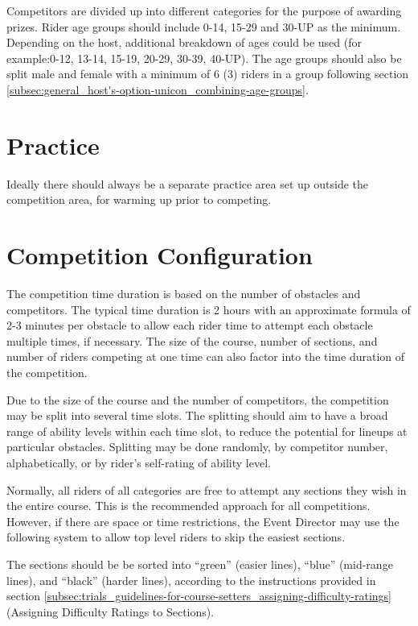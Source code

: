 Competitors are divided up into different categories for the purpose of awarding prizes. 
Rider age groups should include 0-14, 15-29 and 30-UP as the minimum. 
Depending on the host, additional breakdown of ages could be used (for example:0-12, 13-14, 15-19, 20-29, 30-39, 40-UP). 
The age groups should also be split male and female with a minimum of 6 (3) riders in a group following section \ref{subsec:general_host's-option-unicon_combining-age-groups}.

\section{Practice}

Ideally there should always be a separate practice area set up outside the competition area, for warming up prior to competing.

\section{Competition Configuration}

The competition time duration is based on the number of obstacles and competitors. 
The typical time duration is 2 hours with an approximate formula of 2-3 minutes per obstacle to allow each rider time to attempt each obstacle multiple times, if necessary. 
The size of the course, number of sections, and number of riders competing at one time can also factor into the time duration of the competition.

Due to the size of the course and the number of competitors, the competition may be split into several time slots. 
The splitting should aim to have a broad range of ability levels within each time slot, to reduce the potential for lineups at particular obstacles. Splitting may be done randomly, by competitor number, alphabetically, or by rider's self-rating of ability level.

\label{sec:trials_section-restrictions-for-competition-categories}
Normally, all riders of all categories are free to attempt any sections they wish in the entire course.
This is the recommended approach for all competitions. 
However, if there are space or time restrictions, the Event Director may use the following system to allow top level riders to skip the easiest sections. 

The sections should be be sorted into ``green'' (easier lines), ``blue'' (mid-range lines), and ``black'' (harder lines), according to the instructions provided in section \ref{subsec:trials_guidelines-for-course-setters_assigning-difficulty-ratings} (Assigning Difficulty Ratings to Sections). 


